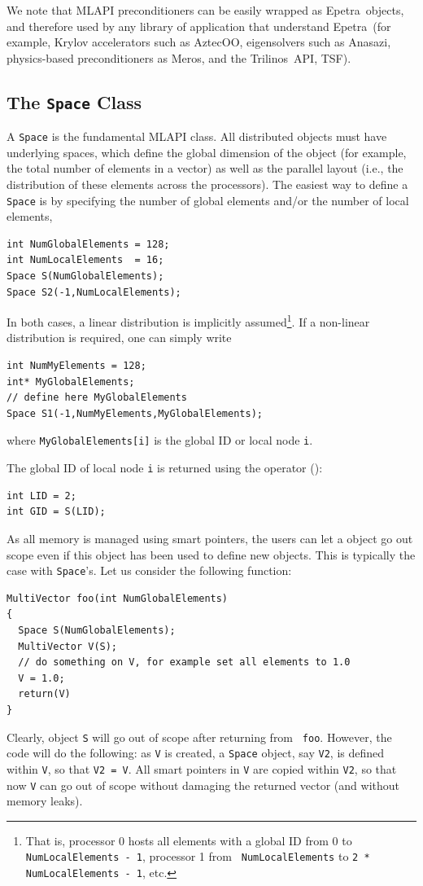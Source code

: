 \documentclass{article}[11pt]
\newcommand{\Aztecoo}  {{\sc AztecOO}}
\newcommand{\aztecoo}  {{\Aztecoo}}
\newcommand{\epetra}  {{\sc Epetra}}
\newcommand{\trilinos}  {{\sc Trilinos}}
\newcommand{\meros}  {{\sc Meros}}
\newcommand{\anasazi}  {{\sc Anasazi}}
\newcommand{\MLAPI}  {{\sc MLAPI }}
\begin{document}
We note that \MLAPI preconditioners can be easily wrapped as \epetra\ objects,
  and therefore used by any library of application that understand \epetra\
  (for example, Krylov accelerators such as \aztecoo, eigensolvers such as
   \anasazi, physics-based preconditioners as \meros, and the \trilinos\ API,
   TSF).

\subsection{The {\tt Space} Class}
\label{sec:space}

A {\tt Space} is the fundamental \MLAPI class. All distributed objects must have
underlying spaces, which define the global dimension of the object 
(for example, the total number of elements in a vector) as well as the
 parallel layout (i.e., the distribution of these elements across the
processors). The easiest way to define a {\tt Space} is by specifying the
number of global elements 
and/or the number of local elements,
\begin{verbatim}
int NumGlobalElements = 128;
int NumLocalElements  = 16;
Space S(NumGlobalElements);
Space S2(-1,NumLocalElements);
\end{verbatim}
In both cases, a linear distribution is implicitly 
assumed\footnote{That is, processor 0 hosts all elements with a global ID
  from 0 to {\tt NumLocalElements - 1}, processor 1 from {\tt
    NumLocalElements} to {\tt 2 * NumLocalElements - 1}, etc.}. If a non-linear
distribution is required, one can simply write
\begin{verbatim}
int NumMyElements = 128;
int* MyGlobalElements;
// define here MyGlobalElements
Space S1(-1,NumMyElements,MyGlobalElements);
\end{verbatim}
where {\tt MyGlobalElements[i]} is the global ID or local node {\tt i}.

The global ID of local node {\tt i} is returned using the operator ():
\begin{verbatim}
int LID = 2;
int GID = S(LID);
\end{verbatim}

\smallskip

As all memory is managed using smart pointers, the users can let a object go
out scope even if this object has been used to define new objects. This is
typically the case with {\tt Space}'s. Let us consider the following function:
\begin{verbatim}
MultiVector foo(int NumGlobalElements)
{
  Space S(NumGlobalElements);
  MultiVector V(S);
  // do something on V, for example set all elements to 1.0
  V = 1.0;
  return(V)
}
\end{verbatim}
Clearly, object {\tt S} will go out of scope after returning from {\tt
  foo}. However, the code will do the following:
as {\tt V} is created, a {\tt Space} object, say {\tt V2}, is defined
within {\tt V}, so that {\tt V2 = V}. All smart pointers in {\tt V} are copied
within {\tt V2}, so that now {\tt V} can go out of scope without damaging the
returned vector (and without memory leaks).
\end{document}
